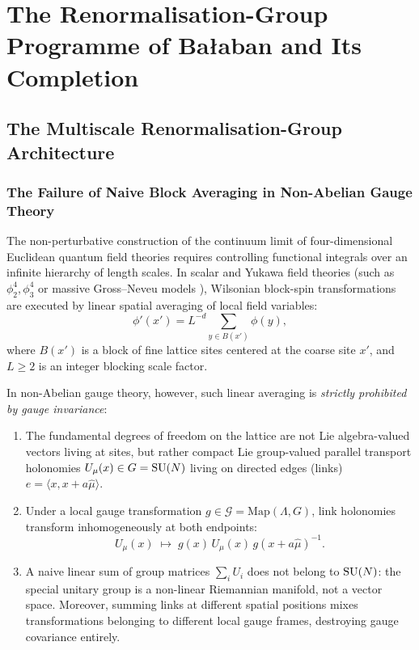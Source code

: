 \chapter{The Renormalisation-Group Programme of Ba\l aban and Its Completion}
\label{ch:balaban}
\label{ch:balaban_rg_program}

\section{The Multiscale Renormalisation-Group Architecture}
\label{sec:balaban_architecture}

\subsection{The Failure of Naive Block Averaging in Non-Abelian Gauge Theory}
\label{subsec:failure_naive_averaging}

The non-perturbative construction of the continuum limit of four-dimensional Euclidean quantum field theories requires controlling functional integrals over an infinite hierarchy of length scales. In scalar and Yukawa field theories (such as $\phi_2^4, \phi_3^4$ or massive Gross--Neveu models \cite{GlimmJaffe1987}), Wilsonian block-spin transformations are executed by linear spatial averaging of local field variables:
\begin{equation}
\label{eq:ch12_scalar_averaging}
\phi'(x') = L^{-d} \sum_{y \in B(x')} \phi(y),
\end{equation}
where $B(x')$ is a block of fine lattice sites centered at the coarse site $x'$, and $L \ge 2$ is an integer blocking scale factor.

In non-Abelian gauge theory, however, such linear averaging is \emph{strictly prohibited by gauge invariance}:
\begin{enumerate}
    \item The fundamental degrees of freedom on the lattice are not Lie algebra-valued vectors living at sites, but rather compact Lie group-valued parallel transport holonomies $U_\mu(x) \in G = \mathrm{SU}(N)$ living on directed edges (links) $e = \langle x, x + a\hat{\mu} \rangle$.
    \item Under a local gauge transformation $g \in \mathcal{G} = \mathrm{Map}(\Lambda, G)$, link holonomies transform inhomogeneously at both endpoints:
    \begin{equation}
    \label{eq:ch12_link_gauge_transf}
    U_\mu(x) \;\mapsto\; g(x) \, U_\mu(x) \, g(x + a\hat{\mu})^{-1}.
    \end{equation}
    \item A naive linear sum of group matrices $\sum_i U_i$ does not belong to $\mathrm{SU}(N)$: the special unitary group is a non-linear Riemannian manifold, not a vector space. Moreover, summing links at different spatial positions mixes transformations belonging to different local gauge frames, destroying gauge covariance entirely.
\end{enumerate}

